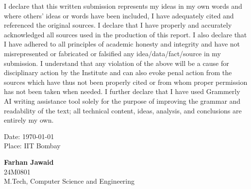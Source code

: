 %
\begin{Declaration}
\noindent
I declare that this written submission represents my ideas in my own words and where others' ideas or words have been included, I have adequately cited and referenced the original sources. I declare that I have properly and accurately acknowledged all sources used in the production of this report. I also declare that I have adhered to all principles of academic honesty and integrity and have not misrepresented or fabricated or falsified any idea/data/fact/source in my submission. I understand that any violation of the above will be a cause for disciplinary action by the Institute and can also evoke penal action from the sources which have thus not been properly cited or from whom proper permission has not been taken when needed. I further declare that I have used Grammerly AI writing assistance tool solely for the purpose of improving the grammar and readability of the text; all technical content, ideas, analysis, and conclusions are entirely my own.

%
%
%
%
%
%
%

\vspace{2cm}
\begin{flushleft}
Date: \today\\
Place: IIT Bombay
\end{flushleft}

\vspace{-2.4cm}
\begin{flushright}
\textbf{Farhan Jawaid} \\
24M0801\\
M.Tech, Computer Science and Engineering \\
\end{flushright}



%
\end{Declaration}
